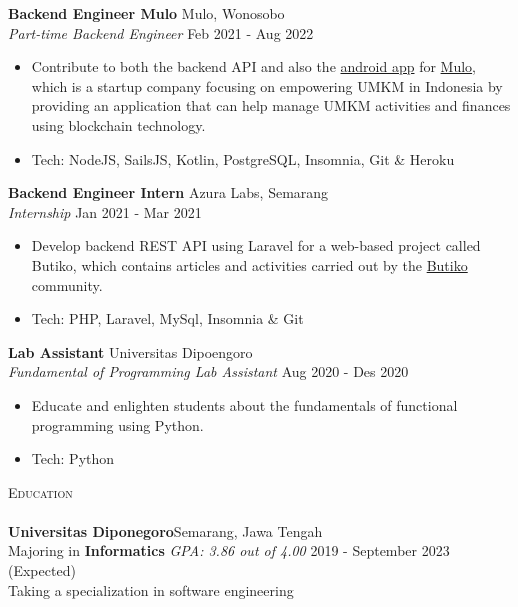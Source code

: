 \documentclass[a4paper]{article}
\newcommand{\lineunder} {
    \vspace*{-8pt} \\
    \hspace*{-18pt} \hrulefill \\
}
\newcommand{\header} [1] {
    {\hspace*{-18pt}\vspace*{6pt} \textsc{#1}}
    \vspace*{-6pt} \lineunder
}
\begin{document}
\textbf{Backend Engineer Mulo} \hfill Mulo, Wonosobo\\
\textit{Part-time Backend Engineer} \hfill Feb 2021 - Aug 2022\\
\vspace{-1mm}
\begin{itemize} \itemsep 1pt
	\item Contribute to both the backend API and also the \href{https://play.google.com/store/apps/details?id=app.mulo}{android app} for \href{https://muloapp.id/}{Mulo}, which is a startup company focusing on empowering UMKM in Indonesia by providing an application that can help manage UMKM activities and finances using blockchain technology.
	\item Tech: NodeJS, SailsJS, Kotlin, PostgreSQL, Insomnia, Git \& Heroku
\end{itemize}

\textbf{Backend Engineer Intern} \hfill Azura Labs, Semarang\\
\textit{Internship} \hfill Jan 2021 - Mar 2021\\
\vspace{-1mm}
\begin{itemize} \itemsep 1pt
	\item Develop backend REST API using Laravel for a web-based project called \textquotesingle{}Butiko\textquotesingle{}, which contains articles and activities carried out by the \textquotesingle{}\href{https://butiko.id/}{Butiko}\textquotesingle{} community.
	\item Tech: PHP, Laravel, MySql, Insomnia \& Git
\end{itemize}

\textbf{Lab Assistant} \hfill Universitas Dipoengoro\\
\textit{Fundamental of Programming Lab Assistant} \hfill Aug 2020 - Des 2020\\
\vspace{-1mm}
\begin{itemize} \itemsep 1pt
	\item Educate and enlighten students about the fundamentals of functional programming using Python.
	\item Tech: Python
\end{itemize}

\header{Education}
\textbf{Universitas Diponegoro}\hfill Semarang, Jawa Tengah\\
Majoring in \textbf{Informatics} \textit{GPA: 3.86 out of 4.00} \hfill 2019 - September 2023 (Expected)\\
Taking a specialization in software engineering
\vspace{2mm}
\end{document}
